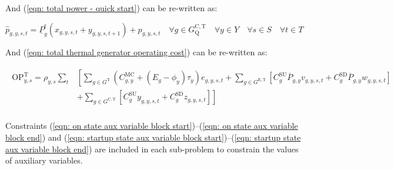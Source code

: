 \documentclass{article}
\newcommand{\sGeneratorsExistingThermal}{G^{\mathrm{E,T}}}
\newcommand{\sGeneratorsCandidateThermal}{G^{\mathrm{C,T}}}
\newcommand{\sGeneratorsThermal}{G^{\mathrm{T}}}
\newcommand{\sYears}{Y}
\newcommand{\sScenarios}{S}
\newcommand{\sIntervals}{T}
\newcommand{\sGeneratorsCandidateThermalQuickStart}{G^{\mathrm{C,T}}_\mathrm{Q}}
\newcommand{\iGenerator}{g}
\newcommand{\iYear}{y}
\newcommand{\iScenario}{s}
\newcommand{\iInterval}{t}
\newcommand{\cOperatingCostThermal}[1][\iYear,\iScenario]{\mathrm{OP}^{\mathrm{T}}_{#1}}
\newcommand{\cScenarioDuration}[1][\iYear,\iScenario]{\rho_{#1}}
\newcommand{\cMarginalCost}[1][\iGenerator,\iYear]{C^{\mathrm{MC}}_{#1}}
\newcommand{\cStartupCost}[1][\iGenerator]{C^{\mathrm{SU}}_{#1}}
\newcommand{\cShutdownCost}[1][\iGenerator]{C^{\mathrm{SD}}_{#1}}
\newcommand{\cEmissionsIntensity}[1][\iGenerator]{E_{#1}}
\newcommand{\cPowerOutputMax}[1][\iGenerator,\iYear]{\overline{P}_{#1}}
\newcommand{\cPowerOutputMin}[1][\iGenerator]{\underline{P}_{#1}}
\newcommand{\cPowerOutputMinProportion}{\cPowerOutputMin^{\mathrm{f}}}
\newcommand{\vBaseline}[1][\iYear]{\phi_{#1}}
\newcommand{\vPermitPrice}[1][\iYear]{\tau_{#1}}
\newcommand{\vEnergy}[1][\iGenerator,\iYear,\iScenario,\iInterval]{e_{#1}}
\newcommand{\vStartupIndicator}[1][\iGenerator,\iYear,\iScenario,\iInterval]{v_{#1}}
\newcommand{\vShutdownIndicator}[1][\iGenerator,\iYear,\iScenario,\iInterval]{w_{#1}}
\newcommand{\vPower}[1][\iGenerator,\iYear,\iScenario,\iInterval]{p_{#1}}
\newcommand{\vPowerTotal}[1][\iGenerator,\iYear,\iScenario,\iInterval]{\hat{p}_{#1}}
\newcommand{\vInstalledCapacityOnStateAux}[1][\iGenerator,\iYear,\iScenario,\iInterval]{x_{#1}}
\newcommand{\vInstalledCapacityStartupStateAux}[1][\iGenerator,\iYear,\iScenario,\iInterval]{y_{#1}}
\newcommand{\vInstalledCapacityShutdownStateAux}[1][\iGenerator,\iYear,\iScenario,\iInterval]{z_{#1}}
\begin{document}
And (\ref{eqn: total power - quick start}) can be re-written as:

\begin{equation}
	\vPowerTotal = \cPowerOutputMinProportion \left(\vInstalledCapacityOnStateAux + \vInstalledCapacityStartupStateAux[\iGenerator,\iYear,\iScenario,\iInterval+1]\right) + \vPower \quad \forall \iGenerator \in \sGeneratorsCandidateThermalQuickStart \quad \forall \iYear \in \sYears \quad \forall \iScenario \in \sScenarios \quad \forall \iInterval \in \sIntervals
\end{equation}

And (\ref{eqn: total thermal generator operating cost}) can be re-written as:

\begin{align}
\begin{split}
\cOperatingCostThermal = \cScenarioDuration\sum\limits_{\iInterval} & \left[\sum\limits_{\iGenerator \in \sGeneratorsThermal} (\cMarginalCost + (\cEmissionsIntensity - \vBaseline)\vPermitPrice)\vEnergy + \sum\limits_{\iGenerator \in \sGeneratorsExistingThermal} \left[\cStartupCost \cPowerOutputMax \vStartupIndicator + \cShutdownCost \cPowerOutputMax \vShutdownIndicator\right] \right.\\
& \left. + \sum\limits_{\iGenerator \in \sGeneratorsCandidateThermal} \left[\cStartupCost \vInstalledCapacityStartupStateAux + \cShutdownCost \vInstalledCapacityShutdownStateAux \right] \right]\\
\end{split}
\end{align}


Constraints (\ref{eqn: on state aux variable block start})--(\ref{eqn: on state aux variable block end}) and (\ref{eqn: startup state aux variable block start})--(\ref{eqn: startup state aux variable block end}) are included in each sub-problem to constrain the values of auxiliary variables.
\end{document}
